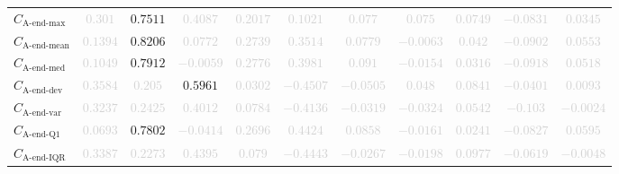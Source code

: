 \documentclass{standalone}
\newcommand{\lastmaxname}{\text{A-end-max}}
\newcommand{\lastmax}{C_{\lastmaxname}}
\newcommand{\lastmeanname}{\text{A-end-mean}}
\newcommand{\lastmean}{C_{\lastmeanname}}
\newcommand{\lastmedianname}{\text{A-end-med}}
\newcommand{\lastmedian}{C_{\lastmedianname}}
\newcommand{\lastdevname}{\text{A-end-dev}}
\newcommand{\lastdev}{C_{\lastdevname}}
\newcommand{\lastvarname}{\text{A-end-var}}
\newcommand{\lastvar}{C_{\lastvarname}}
\newcommand{\lastqonename}{\text{A-end-Q1}}
\newcommand{\lastqone}{C_{\lastqonename}}
\newcommand{\lastiqrname}{\text{A-end-IQR}}
\newcommand{\lastiqr}{C_{\lastiqrname}}
\begin{document}
\begin{tabular}{lcccccccccc}
$\lastmax$ & \textcolor{lightgray}{$0.301$} & $0.7511$ & \textcolor{lightgray}{$0.4087$} & \textcolor{lightgray}{$0.2017$} & \textcolor{lightgray}{$0.1021$} & \textcolor{lightgray}{$0.077$} & \textcolor{lightgray}{$0.075$} & \textcolor{lightgray}{$0.0749$} & \textcolor{lightgray}{$-0.0831$} & \textcolor{lightgray}{$0.0345$} \\ 
$\lastmean$ & \textcolor{lightgray}{$0.1394$} & $0.8206$ & \textcolor{lightgray}{$0.0772$} & \textcolor{lightgray}{$0.2739$} & \textcolor{lightgray}{$0.3514$} & \textcolor{lightgray}{$0.0779$} & \textcolor{lightgray}{$-0.0063$} & \textcolor{lightgray}{$0.042$} & \textcolor{lightgray}{$-0.0902$} & \textcolor{lightgray}{$0.0553$} \\ 
$\lastmedian$ & \textcolor{lightgray}{$0.1049$} & $0.7912$ & \textcolor{lightgray}{$-0.0059$} & \textcolor{lightgray}{$0.2776$} & \textcolor{lightgray}{$0.3981$} & \textcolor{lightgray}{$0.091$} & \textcolor{lightgray}{$-0.0154$} & \textcolor{lightgray}{$0.0316$} & \textcolor{lightgray}{$-0.0918$} & \textcolor{lightgray}{$0.0518$} \\ 
$\lastdev$ & \textcolor{lightgray}{$0.3584$} & \textcolor{lightgray}{$0.205$} & $0.5961$ & \textcolor{lightgray}{$0.0302$} & \textcolor{lightgray}{$-0.4507$} & \textcolor{lightgray}{$-0.0505$} & \textcolor{lightgray}{$0.048$} & \textcolor{lightgray}{$0.0841$} & \textcolor{lightgray}{$-0.0401$} & \textcolor{lightgray}{$0.0093$} \\ 
$\lastvar$ & \textcolor{lightgray}{$0.3237$} & \textcolor{lightgray}{$0.2425$} & \textcolor{lightgray}{$0.4012$} & \textcolor{lightgray}{$0.0784$} & \textcolor{lightgray}{$-0.4136$} & \textcolor{lightgray}{$-0.0319$} & \textcolor{lightgray}{$-0.0324$} & \textcolor{lightgray}{$0.0542$} & \textcolor{lightgray}{$-0.103$} & \textcolor{lightgray}{$-0.0024$} \\ 
$\lastqone$ & \textcolor{lightgray}{$0.0693$} & $0.7802$ & \textcolor{lightgray}{$-0.0414$} & \textcolor{lightgray}{$0.2696$} & \textcolor{lightgray}{$0.4424$} & \textcolor{lightgray}{$0.0858$} & \textcolor{lightgray}{$-0.0161$} & \textcolor{lightgray}{$0.0241$} & \textcolor{lightgray}{$-0.0827$} & \textcolor{lightgray}{$0.0595$} \\ 
$\lastiqr$ & \textcolor{lightgray}{$0.3387$} & \textcolor{lightgray}{$0.2273$} & \textcolor{lightgray}{$0.4395$} & \textcolor{lightgray}{$0.079$} & \textcolor{lightgray}{$-0.4443$} & \textcolor{lightgray}{$-0.0267$} & \textcolor{lightgray}{$-0.0198$} & \textcolor{lightgray}{$0.0977$} & \textcolor{lightgray}{$-0.0619$} & \textcolor{lightgray}{$-0.0048$} \\ 

\end{tabular}
\end{document}
